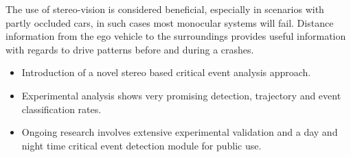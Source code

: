 The use of stereo-vision is considered beneficial, especially in scenarios with partly occluded cars, in such cases most monocular systems will fail. Distance information from the ego vehicle to the surroundings provides useful information with regards to drive patterns before and during a crashes. 
\begin{itemize}
\item Introduction of a novel stereo based critical event analysis approach.
\item Experimental analysis shows very promising detection, trajectory and event classification rates.
\item Ongoing research involves extensive experimental validation and a day and night time critical event detection module for public use.
\end{itemize}



\vspace{2pt}